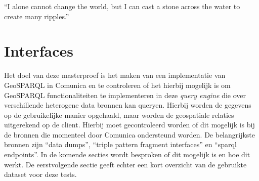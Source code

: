 \begin{savequote}[0.55\linewidth]
	``I alone cannot change the world, but I can cast a stone across the water to create many ripples.''
\end{savequote}

\chapter{Interfaces}
\label{chap:interfaces}
Het doel van deze masterproef is het maken van een implementatie van GeoSPARQL in Comunica en te controleren of het hierbij mogelijk is om GeoSPARQL functionaliteiten te implementeren in deze \textit{query engine} die over verschillende heterogene data bronnen kan queryen. Hierbij worden de gegevens op de gebruikelijke manier opgehaald, maar worden de geospatiale relaties uitgerekend op de client. Hierbij moet gecontroleerd worden of dit mogelijk is bij de bronnen die momenteel door Comunica ondersteund worden. De belangrijkste bronnen zijn ``data dumps'', ``triple pattern fragment interfaces'' en ``sparql endpoints''. In de komende secties wordt besproken of dit mogelijk is en hoe dit werkt. De eerstvolgende sectie geeft echter een kort overzicht van de gebruikte dataset voor deze tests.

 
\newpage
 
\newpage
 
\newpage
 
\newpage